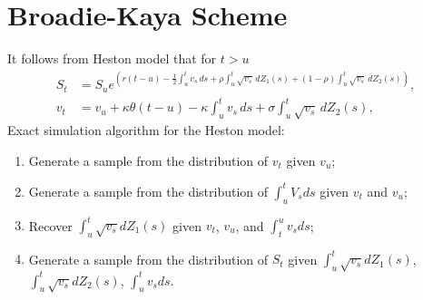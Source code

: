     \section{Broadie-Kaya Scheme}
        It follows from Heston model that for $t > u$
        \begin{align}
            S_t &= S_u e^{\left( r(t-u)-\frac{1}{2} \int_{u}^{t} v_s \, ds  + \rho\int_{u}^{t} \sqrt{v_s} \, dZ_1(s) + (1-\rho)\int_{u}^{t} \sqrt{v_s} \, dZ_2(s)  \right)}, \label{BK:Price_int} \\
            v_t &= v_u + \kappa\theta(t-u) - \kappa \int_{u}^{t} v_s \, ds + \sigma\int_{u}^{t} \sqrt{v_s} \, dZ_2(s), \label{BK:Vol_int}
        \end{align}
        Exact simulation algorithm for the Heston model:
        \begin{enumerate}
            \item Generate a sample from the distribution of $v_t$ given $v_u$;
            \item Generate a sample from the distribution of $\int_{u}^t V_s ds$ given $v_t$ and $v_u$;
            \item Recover $\int_{u}^t \sqrt{v_s} dZ_1(s)$ given $v_t$, $v_u$, and $\int_{t}^u v_s ds$;
            \item Generate a sample from the distribution of $S_t$ given $\int_u^t \sqrt{v_s} dZ_1(s)$, $\int_u^t \sqrt{v_s} dZ_2(s)$, $\int_u^t v_s ds$.
        \end{enumerate}


